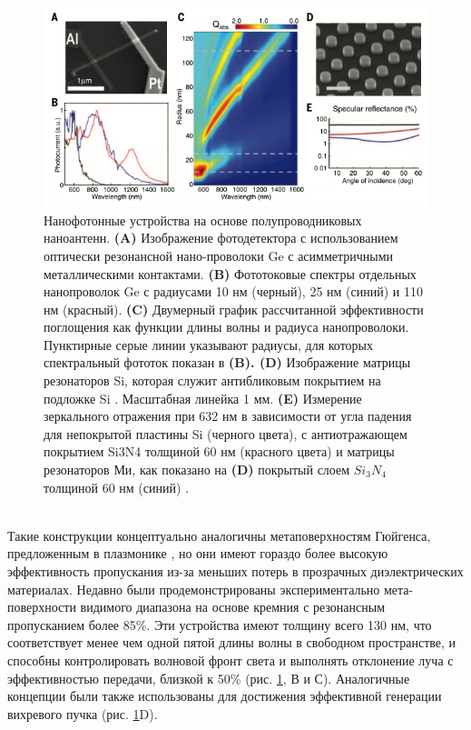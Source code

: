  \begin{figure}[h!]
	\centering
	\includegraphics[width=0.8\linewidth]{images/fig5.png}
	\caption{ Нанофотонные устройства на основе полупроводниковых наноантенн. \textbf{(A)} Изображение фотодетектора с использованием оптически резонансной нано-проволоки Ge с асимметричными металлическими контактами. \textbf{(B)} Фототоковые спектры отдельных нанопроволок Ge с радиусами 10 нм (черный), 25 нм (синий) и 110 нм (красный). \textbf{(C)} Двумерный график рассчитанной эффективности поглощения как функции длины волны и радиуса нанопроволоки. Пунктирные серые линии указывают радиусы, для которых спектральный фототок показан в \textbf{(B). (D)} Изображение матрицы резонаторов Si, которая служит антибликовым покрытием на подложке Si \cite{spinelli2012broadband}. Масштабная линейка 1 мм. \textbf{(E)} Измерение зеркального отражения при 632 нм в зависимости от угла падения для непокрытой пластины Si (черного цвета), с антиотражающем покрытием Si3N4 толщиной 60 нм (красного цвета) и матрицы резонаторов Ми, как показано на \textbf{(D)} покрытый слоем $Si_3N_4$ толщиной 60 нм (синий) \cite{spinelli2012broadband}. }
	\label{nonliner:matasurf1}
\end{figure}
\\
\hspace*{2mm}
Такие конструкции концептуально аналогичны метаповерхностям Гюйгенса, предложенным в плазмонике \cite{pfeiffer2014efficient}, но они имеют гораздо более высокую эффективность пропускания из-за меньших потерь в прозрачных диэлектрических материалах. Недавно были продемонстрированы экспериментально мета-поверхности видимого диапазона на основе кремния с резонансным пропусканием более 85\%. Эти устройства имеют толщину всего 130 нм, что соответствует менее чем одной пятой длины волны в свободном пространстве, и способны контролировать волновой фронт света и выполнять отклонение луча с эффективностью передачи, близкой к 50\% (рис. \ref{nonliner:matasurf1}, В и С). Аналогичные концепции были также использованы для достижения эффективной генерации вихревого пучка (рис. \ref{nonliner:matasurf1}D). 
